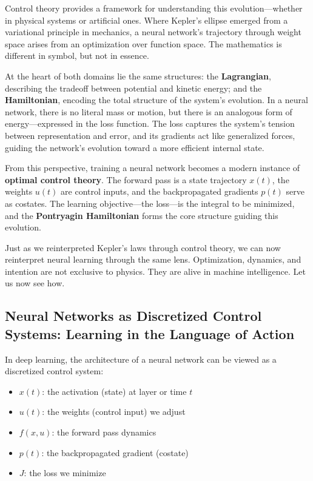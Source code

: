 Control theory provides a framework for understanding this evolution—whether in physical systems or artificial ones. Where Kepler’s ellipse emerged from a variational principle in mechanics, a neural network’s trajectory through weight space arises from an optimization over function space. The mathematics is different in symbol, but not in essence.

At the heart of both domains lie the same structures: the \textbf{Lagrangian}, describing the tradeoff between potential and kinetic energy; and the \textbf{Hamiltonian}, encoding the total structure of the system’s evolution. In a neural network, there is no literal mass or motion, but there is an analogous form of energy—expressed in the loss function. The loss captures the system’s tension between representation and error, and its gradients act like generalized forces, guiding the network’s evolution toward a more efficient internal state.

From this perspective, training a neural network becomes a modern instance of \textbf{optimal control theory}. The forward pass is a state trajectory \( x(t) \), the weights \( u(t) \) are control inputs, and the backpropagated gradients \( p(t) \) serve as costates. The learning objective—the loss—is the integral to be minimized, and the \textbf{Pontryagin Hamiltonian} forms the core structure guiding this evolution.

Just as we reinterpreted Kepler’s laws through control theory, we can now reinterpret neural learning through the same lens. Optimization, dynamics, and intention are not exclusive to physics. They are alive in machine intelligence. Let us now see how.

\subsection{Neural Networks as Discretized Control Systems: Learning in the Language of Action}

In deep learning, the architecture of a neural network can be viewed as a discretized control system:

\begin{itemize}
  \item \( x(t) \): the activation (state) at layer or time \( t \)
  \item \( u(t) \): the weights (control input) we adjust
  \item \( f(x, u) \): the forward pass dynamics
  \item \( p(t) \): the backpropagated gradient (costate)
  \item \( J \): the loss we minimize
\end{itemize}


